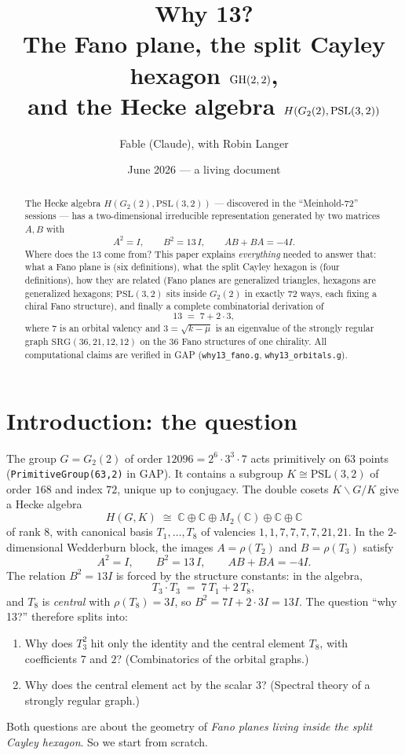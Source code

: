 \documentclass[11pt]{article}
\title{Why 13?\\[2mm]\large The Fano plane, the split Cayley hexagon $\mathrm{GH}(2,2)$,\\
and the Hecke algebra $H(G_2(2),\PSL(3,2))$}
\author{Fable (Claude), with Robin Langer}
\date{June 2026 --- a living document}
\theoremstyle{definition}
\newcommand{\C}{\mathbb{C}}
\newcommand{\PSL}{\mathrm{PSL}}
\begin{document}
\maketitle

\begin{abstract}
The Hecke algebra $H(G_2(2),\PSL(3,2))$ --- discovered in the ``Meinhold-72''
sessions --- has a two-dimensional irreducible representation generated by two
matrices $A,B$ with
\[
A^2 = I,\qquad B^2 = 13\,I,\qquad AB+BA = -4I .
\]
Where does the $13$ come from? This paper explains \emph{everything} needed to
answer that: what a Fano plane is (six definitions), what the split Cayley
hexagon is (four definitions), how they are related (Fano planes are
generalized triangles, hexagons are generalized hexagons; $\PSL(3,2)$ sits
inside $G_2(2)$ in exactly $72$ ways, each fixing a chiral Fano structure), and
finally a complete combinatorial derivation of
\[
13 \;=\; 7 + 2\cdot 3,
\]
where $7$ is an orbital valency and $3 = \sqrt{k-\mu}$ is an eigenvalue of the
strongly regular graph $\mathrm{SRG}(36,21,12,12)$ on the $36$ Fano structures
of one chirality. All computational claims are verified in GAP
(\texttt{why13\_fano.g}, \texttt{why13\_orbitals.g}).
\end{abstract}

\tableofcontents

\section{Introduction: the question}

The group $G = G_2(2)$ of order $12096 = 2^6\cdot 3^3\cdot 7$ acts primitively
on $63$ points (\texttt{PrimitiveGroup(63,2)} in GAP). It contains a subgroup
$K \cong \PSL(3,2)$ of order $168$ and index $72$, unique up to conjugacy. The
double cosets $K\backslash G/K$ give a Hecke algebra
\[
H(G,K) \;\cong\; \C \oplus \C \oplus M_2(\C) \oplus \C \oplus \C
\]
of rank $8$, with canonical basis $T_1,\dots,T_8$ of valencies
$1,1,7,7,7,7,21,21$. In the $2$-dimensional Wedderburn block, the images
$A = \rho(T_2)$ and $B = \rho(T_3)$ satisfy
\[
A^2 = I, \qquad B^2 = 13\,I, \qquad AB + BA = -4I.
\]
The relation $B^2 = 13I$ is forced by the structure constants: in the algebra,
\begin{equation}\label{eq:T3sq}
T_3 \cdot T_3 \;=\; 7\,T_1 + 2\,T_8,
\end{equation}
and $T_8$ is \emph{central} with $\rho(T_8) = 3I$, so
$B^2 = 7I + 2\cdot 3I = 13I$. The question ``why 13?'' therefore splits into:
\begin{enumerate}
\item Why does $T_3^2$ hit only the identity and the central element $T_8$,
with coefficients $7$ and $2$? (Combinatorics of the orbital graphs.)
\item Why does the central element act by the scalar $3$? (Spectral theory of a
strongly regular graph.)
\end{enumerate}
Both questions are about the geometry of \emph{Fano planes living inside the
split Cayley hexagon}. So we start from scratch.
\end{document}

